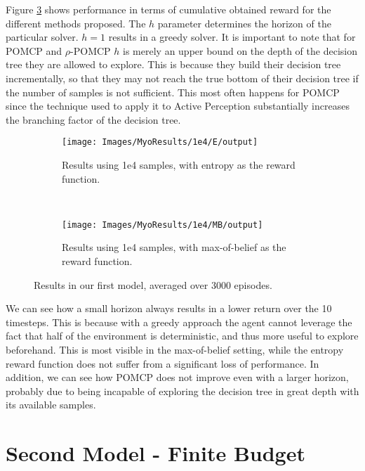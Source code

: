 Figure \ref{ref:myoentropyfig} shows performance in terms of cumulative obtained reward for the
different methods proposed. The $h$ parameter determines the horizon of the particular solver. $h =
1$ results in a greedy solver. It is important to note that for POMCP and $\rho$-POMCP $h$ is merely an
upper bound on the depth of the decision tree they are allowed to explore. This is because they
build their decision tree incrementally, so that they may not reach the true bottom of their
decision tree if the number of samples is not sufficient. This most often happens for POMCP since
the technique used to apply it to Active Perception substantially increases the branching factor of
the decision tree.

\begin{figure}[ht!]
        \centering
        \begin{subfigure}[t]{0.45\textwidth}
                \texttt{[image: Images/MyoResults/1e4/E/output]}
                \caption{Results using 1e4 samples, with entropy as the reward function.}
                \label{fig:m4e}
        \end{subfigure}%
        ~ %
        \begin{subfigure}[t]{0.45\textwidth}
                \texttt{[image: Images/MyoResults/1e4/MB/output]}
                \caption{Results using 1e4 samples, with max-of-belief as the reward function.}
                \label{fig:m5e}
        \end{subfigure}
        \caption{Results in our first model, averaged over 3000 episodes.}
        \label{ref:myoentropyfig}
\end{figure}

We can see how a small horizon always results in a lower return over the 10 timesteps. This is
because with a greedy approach the agent cannot leverage the fact that half of the environment is
deterministic, and thus more useful to explore beforehand. This is most visible in the max-of-belief
setting, while the entropy reward function does not suffer from a significant loss of performance.
In addition, we can see how POMCP does not improve even with a larger horizon, probably due to being
incapable of exploring the decision tree in great depth with its available samples.

\section{Second Model - Finite Budget}

